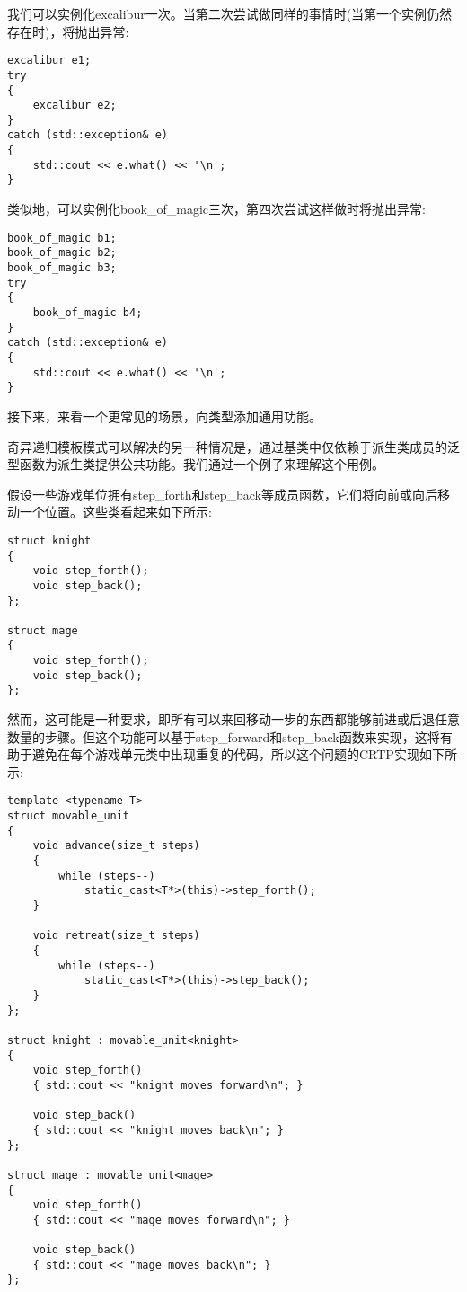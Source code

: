 我们可以实例化excalibur一次。当第二次尝试做同样的事情时(当第一个实例仍然存在时)，将抛出异常:

\begin{lstlisting}[style=styleCXX]
excalibur e1;
try
{
	excalibur e2;
}
catch (std::exception& e)
{
	std::cout << e.what() << '\n';
}
\end{lstlisting}

类似地，可以实例化book\_of\_magic三次，第四次尝试这样做时将抛出异常:

\begin{lstlisting}[style=styleCXX]
book_of_magic b1;
book_of_magic b2;
book_of_magic b3;
try
{
	book_of_magic b4;
}
catch (std::exception& e)
{
	std::cout << e.what() << '\n';
}
\end{lstlisting}

接下来，来看一个更常见的场景，向类型添加通用功能。


奇异递归模板模式可以解决的另一种情况是，通过基类中仅依赖于派生类成员的泛型函数为派生类提供公共功能。我们通过一个例子来理解这个用例。

假设一些游戏单位拥有step\_forth和step\_back等成员函数，它们将向前或向后移动一个位置。这些类看起来如下所示:

\begin{lstlisting}[style=styleCXX]
struct knight
{
	void step_forth();
	void step_back();
};

struct mage
{
	void step_forth();
	void step_back();
};
\end{lstlisting}

然而，这可能是一种要求，即所有可以来回移动一步的东西都能够前进或后退任意数量的步骤。但这个功能可以基于step\_forward和step\_back函数来实现，这将有助于避免在每个游戏单元类中出现重复的代码，所以这个问题的CRTP实现如下所示:

\begin{lstlisting}[style=styleCXX]
template <typename T>
struct movable_unit
{
	void advance(size_t steps)
	{
		while (steps--)
			static_cast<T*>(this)->step_forth();
	}

	void retreat(size_t steps)
	{
		while (steps--)
			static_cast<T*>(this)->step_back();
	}
};

struct knight : movable_unit<knight>
{
	void step_forth()
	{ std::cout << "knight moves forward\n"; }
	
	void step_back()
	{ std::cout << "knight moves back\n"; }
};

struct mage : movable_unit<mage>
{
	void step_forth()
	{ std::cout << "mage moves forward\n"; }
	
	void step_back()
	{ std::cout << "mage moves back\n"; }
};
\end{lstlisting}

